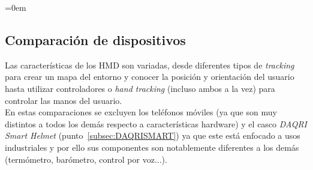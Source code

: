\parindent=0em
\subsection{Comparación de dispositivos}
\noindent

Las características de los HMD son variadas, desde diferentes tipos de \textit{tracking} para crear un mapa del entorno y conocer la posición y orientación del usuario hasta utilizar controladores o \textit{hand tracking} (incluso ambos a la vez) para controlar las manos del usuario.\\ 

En estas comparaciones se excluyen los teléfonos móviles (ya que son muy distintos a todos los demás respecto a características hardware) y el casco \textit{DAQRI Smart Helmet} (punto~\ref{subsec:DAQRISMART}) ya que este está enfocado a usos industriales y por ello sus componentes son notablemente diferentes a los demás (termómetro, barómetro, control por voz...).\\

\begin{table}[ht]
\centering
{}
\caption{Comparación del apartado visual de los \textit{HMD}.}
\label{cuadro:comparacionHMDVisual}
\end{table}


